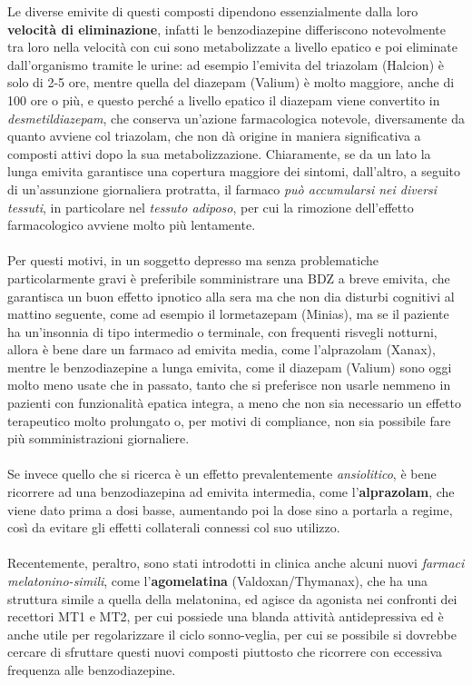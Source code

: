 \begin{itemize}
Le diverse emivite di questi composti dipendono essenzialmente dalla
loro \textbf{velocità di eliminazione}, infatti le benzodiazepine
differiscono notevolmente tra loro nella velocità con cui sono
metabolizzate a livello epatico e poi eliminate dall'organismo tramite
le urine: ad esempio l'emivita del triazolam (Halcion) è solo di 2-5
ore, mentre quella del diazepam (Valium) è molto maggiore, anche di 100
ore o più, e questo perché a livello epatico il diazepam viene
convertito in \emph{desmetildiazepam}, che conserva un'azione
farmacologica notevole, diversamente da quanto avviene col triazolam,
che non dà origine in maniera significativa a composti attivi dopo la
sua metabolizzazione. Chiaramente, se da un lato la lunga emivita
garantisce una copertura maggiore dei sintomi, dall'altro, a seguito di
un'assunzione giornaliera protratta, il farmaco \emph{può accumularsi
nei diversi tessuti}, in particolare nel \emph{tessuto adiposo}, per cui
la rimozione dell'effetto farmacologico avviene molto più lentamente.
\\\\
Per questi motivi, in un soggetto depresso ma senza problematiche
particolarmente gravi è preferibile somministrare una BDZ a breve
emivita, che garantisca un buon effetto ipnotico alla sera ma che non
dia disturbi cognitivi al mattino seguente, come ad esempio il
lormetazepam (Minias), ma se il paziente ha un'insonnia di tipo
intermedio o terminale, con frequenti risvegli notturni, allora è bene
dare un farmaco ad emivita media, come l'alprazolam (Xanax), mentre le
benzodiazepine a lunga emivita, come il diazepam (Valium) sono oggi
molto meno usate che in passato, tanto che si preferisce non usarle
nemmeno in pazienti con funzionalità epatica integra, a meno che non sia
necessario un effetto terapeutico molto prolungato o, per motivi di
compliance, non sia possibile fare più somministrazioni giornaliere.
\\\\
Se invece quello che si ricerca è un effetto prevalentemente
\emph{ansiolitico}, è bene ricorrere ad una benzodiazepina ad emivita
intermedia, come l'\textbf{alprazolam}, che viene dato prima a dosi
basse, aumentando poi la dose sino a portarla a regime, così da evitare
gli effetti collaterali connessi col suo utilizzo.
\\\\
Recentemente, peraltro, sono stati introdotti in clinica anche alcuni
nuovi \emph{farmaci melatonino-simili}, come l'\textbf{agomelatina}
(Valdoxan/Thymanax), che ha una struttura simile a quella della
melatonina, ed agisce da agonista nei confronti dei recettori MT1 e MT2,
per cui possiede una blanda attività antidepressiva ed è anche utile per
regolarizzare il ciclo sonno-veglia, per cui se possibile si dovrebbe
cercare di sfruttare questi nuovi composti piuttosto che ricorrere con
eccessiva frequenza alle benzodiazepine.


\end{itemize}

